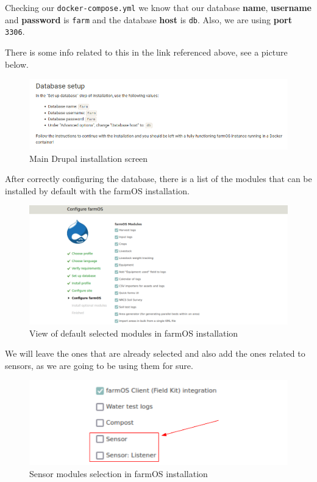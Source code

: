 Checking our \verb|docker-compose.yml| we know that our database \textbf{name}, \textbf{username} and \textbf{password} is \verb|farm| and the database \textbf{host} is \verb|db|. Also, we are using \textbf{port} \verb|3306|.

There is some info related to this in the link referenced above, see a picture below.

\begin{figure}[H]
    \centering
    \includegraphics[width=1\textwidth]{fig/drupal-install/db-setup-tutorial.png}
    \caption{Main Drupal installation screen}
    \label{fig:db-setup-tutorial}
\end{figure}

\vspace{7mm}
After correctly configuring the database, there is a list of the modules that can be installed by default with the farmOS installation.

\begin{figure}[H]
    \centering
    \includegraphics[width=1\textwidth]{fig/drupal-install/farmos-modules.png}
    \caption{View of default selected modules in farmOS installation}
    \label{fig:farmos-modules}
\end{figure}

We will leave the ones that are already selected and also add the ones related to sensors, as we are going to be using them for sure.

\begin{figure}[H]
    \centering
    \includegraphics[width=1\textwidth]{fig/drupal-install/sensor-modules.png}
    \caption{Sensor modules selection in farmOS installation}
    \label{fig:sensor-modules}
\end{figure}

